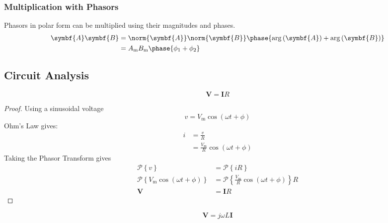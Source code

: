\documentclass{article}
\begin{document}
\subsubsection{Multiplication with Phasors}
Phasors in polar form can be multiplied using their magnitudes and phases.
\begin{align*}
    \symbf{A} \symbf{B} & = \norm{\symbf{A}} \norm{\symbf{B}} \phase{\arg{\left( \symbf{A} \right)} + \arg{\left( \symbf{B} \right)}} \\
                        & = A_{\mathrm{m}} B_{\mathrm{m}} \phase{\phi_1 + \phi_2}
\end{align*}
\subsection{Circuit Analysis}
\begin{theorem}
    \begin{equation*}
        \symbf{V} = \symbf{I} R
    \end{equation*}
\end{theorem}
\begin{proof}
    Using a sinusoidal voltage
    \begin{equation*}
        v = V_{\mathrm{m}}\cos{\left( \omega t + \phi \right)}
    \end{equation*}
    Ohm's Law gives:
    \begin{align*}
        i & = \frac{v}{R}                                                   \\
          & = \frac{V_{\mathrm{m}}}{R} \cos{\left( \omega t + \phi \right)}
    \end{align*}
    Taking the Phasor Transform gives
    \begin{align*}
        \mathscr{P}\left\{ v \right\}                                                  & = \mathscr{P}\left\{ iR \right\}                                                              \\
        \mathscr{P}\left\{ V_{\mathrm{m}}\cos{\left( \omega t + \phi \right)} \right\} & = \mathscr{P}\left\{ \frac{V_{\mathrm{m}}}{R} \cos{\left( \omega t + \phi \right)} \right\} R \\
        \symbf{V}                                                                      & = \symbf{I} R
    \end{align*}
\end{proof}
\begin{theorem}
    \begin{equation*}
        \symbf{V} = j\omega L\symbf{I}
    \end{equation*}
\end{theorem}
\end{document}
